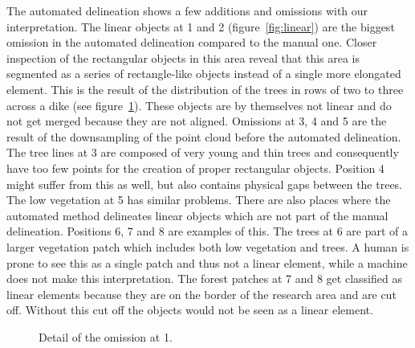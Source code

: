The automated delineation shows a few additions and omissions with our interpretation. The linear objects at 1 and 2 (figure~\ref{fig:linear}) are the biggest omission in the automated delineation compared to the manual one. Closer inspection of the rectangular objects in this area reveal that this area is segmented as a series of rectangle-like objects instead of a single more elongated element. This is the result of the distribution of the trees in rows of two to three across a dike (see figure~\ref{fig:omission}). These objects are by themselves not linear and do not get merged because they are not aligned. Omissions at 3, 4 and 5 are the result of the downsampling of the point cloud before the automated delineation. The tree lines at 3 are composed of very young and thin trees and consequently have too few points for the creation of proper rectangular objects. Position 4 might suffer from this as well, but also contains physical gaps between the trees. The low vegetation at 5 has similar problems. There are also places where the automated method delineates linear objects which are not part of the manual delineation. Positions 6, 7 and 8 are examples of this. The trees at 6 are part of a larger vegetation patch which includes both low vegetation and trees. A human is prone to see this as a single patch and thus not a linear element, while a machine does not make this interpretation. The forest patches at 7 and 8 get classified as linear elements because they are on the border of the research area and are cut off. Without this cut off the objects would not be seen as a linear element.

\begin{figure}
	\centering
	\caption{Detail of the omission at 1.}
	\label{fig:omission}
\end{figure}

